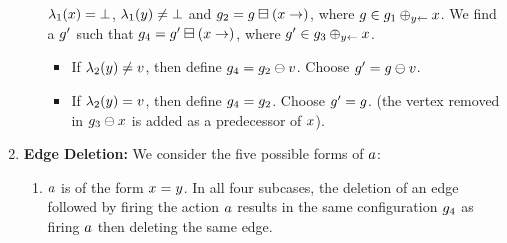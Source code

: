 \begin{enumerate}
\begin{enumerate}
    $\lambda_1(x)=\bot$,
    $\lambda_1(y)\neq\bot$ and %
    $g_2=g\boxminus({x}\rightarrow)$, where %
    $g\in g_1\oplus_{{y}\leftarrow}{x}$.
    We find a $g'$ such that 
    $g_4=g'\boxminus({x}\rightarrow)$, where %
    $g'\in g_3\oplus_{{y}\leftarrow}{x}$.
\begin{itemize}
\item If $\lambda_2(y)\neq v$, then
  define $g_4=g_2\ominus{\ensuremath{v}}$.
  Choose $g'=g\ominus{\ensuremath{v}}$.
\item If $\lambda_2(y)=v$, then
  define $g_4=g_2$.
  Choose $g'=g$.
  (the vertex removed in $g_3\ominus{\ensuremath{x}}$ is added 
  as a predecessor of $x$).
\end{itemize}
%
\end{enumerate}
\item {\bf Edge Deletion:}
%
We consider
the five possible forms of $a$:
%
\begin{enumerate}
\item $a$ is of the form $x=y$.
%
In all four subcases, the deletion of an edge followed by 
firing the action $a$ results in the same configuration
$g_4$ as firing $a$ then deleting the same edge.

\end{enumerate}
\end{enumerate}
